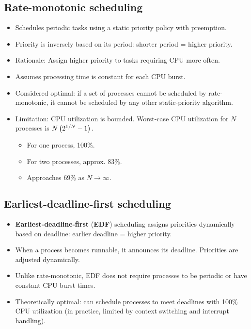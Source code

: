 \subsection{Rate-monotonic scheduling}
\begin{itemize}
    \item Schedules periodic tasks using a static priority policy with preemption.
    \item Priority is inversely based on its period: shorter period = higher priority.
    \item Rationale: Assign higher priority to tasks requiring CPU more often.
    \item Assumes processing time is constant for each CPU burst.
    \item Considered optimal: if a set of processes cannot be scheduled by rate-monotonic, it cannot be scheduled by any other static-priority algorithm.
    \item Limitation: CPU utilization is bounded. Worst-case CPU utilization for $N$ processes is $N\left( {{2^{1/N}} - 1} \right){\rm{.}}$
        \begin{itemize}
            \item For one process, 100\%.
            \item For two processes, approx. 83\%.
            \item Approaches 69\% as $N \to \infty$.
        \end{itemize}
\end{itemize}

\subsection{Earliest-deadline-first scheduling}
\begin{itemize}
    \item \textbf{Earliest-deadline-first} (\textbf{EDF}) scheduling assigns priorities dynamically based on deadline: earlier deadline = higher priority.
    \item When a process becomes runnable, it announces its deadline. Priorities are adjusted dynamically.
    \item Unlike rate-monotonic, EDF does not require processes to be periodic or have constant CPU burst times.
    \item Theoretically optimal: can schedule processes to meet deadlines with 100\% CPU utilization (in practice, limited by context switching and interrupt handling).
\end{itemize}

